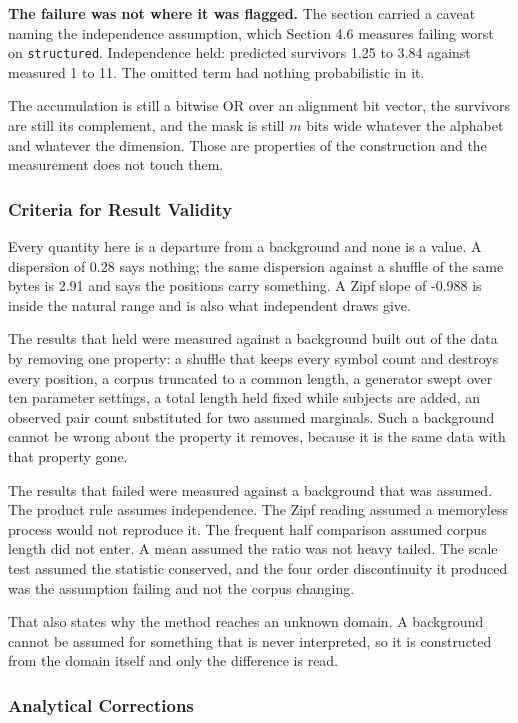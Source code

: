 \textbf{The failure was not where it was flagged.} The section carried a caveat naming the independence assumption, which Section 4.6 measures failing worst on \texttt{structured}. Independence held: predicted survivors 1.25 to 3.84 against measured 1 to 11. The omitted term had nothing probabilistic in it.

The accumulation is still a bitwise OR over an alignment bit vector, the survivors are still its complement, and the mask is still \(m\) bits wide whatever the alphabet and whatever the dimension. Those are properties of the construction and the measurement does not touch them.

\subsubsection{Criteria for Result Validity}

Every quantity here is a departure from a background and none is a value. A dispersion of 0.28 says nothing; the same dispersion against a shuffle of the same bytes is 2.91 and says the positions carry something. A Zipf slope of -0.988 is inside the natural range and is also what independent draws give.

The results that held were measured against a background built out of the data by removing one property: a shuffle that keeps every symbol count and destroys every position, a corpus truncated to a common length, a generator swept over ten parameter settings, a total length held fixed while subjects are added, an observed pair count substituted for two assumed marginals. Such a background cannot be wrong about the property it removes, because it is the same data with that property gone.

The results that failed were measured against a background that was assumed. The product rule assumes independence. The Zipf reading assumed a memoryless process would not reproduce it. The frequent half comparison assumed corpus length did not enter. A mean assumed the ratio was not heavy tailed. The scale test assumed the statistic conserved, and the four order discontinuity it produced was the assumption failing and not the corpus changing.

That also states why the method reaches an unknown domain. A background cannot be assumed for something that is never interpreted, so it is constructed from the domain itself and only the difference is read.

\subsubsection{Analytical Corrections}

